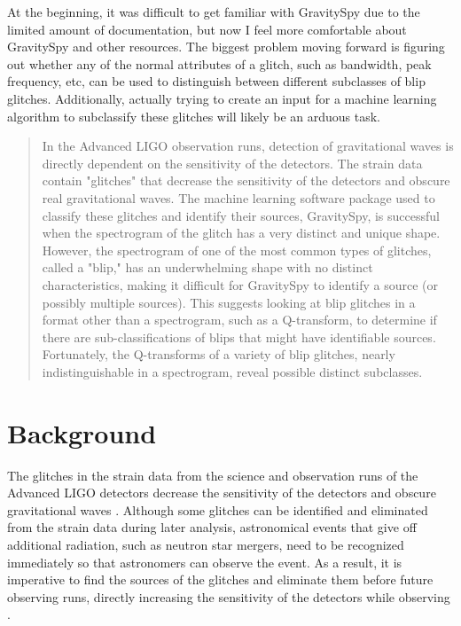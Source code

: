 \documentclass[a4paper]{article}
\begin{document}
At the beginning, it was difficult to get familiar with GravitySpy due to the limited amount of documentation, but now I feel more comfortable about GravitySpy and other resources. The biggest problem moving forward is figuring out whether any of the normal attributes of a glitch, such as bandwidth, peak frequency, etc, can be used to distinguish between different subclasses of blip glitches. Additionally, actually trying to create an input for a machine learning algorithm to subclassify these glitches will likely be an arduous task.

\pagebreak


\begin{abstract}

In the Advanced LIGO observation runs, detection of gravitational waves is directly dependent on the sensitivity of the detectors. The strain data contain "glitches" that decrease the sensitivity of the detectors and obscure real gravitational waves. The machine learning software package used to classify these glitches and identify their sources, GravitySpy, is successful when the spectrogram of the glitch has a very distinct and unique shape. However, the spectrogram of one of the most common types of glitches, called a "blip," has an underwhelming shape with no distinct characteristics, making it difficult for GravitySpy to identify a source (or possibly multiple sources). This suggests looking at blip glitches in a format other than a spectrogram, such as a Q-transform, to determine if there are sub-classifications of blips that might have identifiable sources. Fortunately, the Q-transforms of a variety of blip glitches, nearly indistinguishable in a spectrogram, reveal possible distinct subclasses.

\end{abstract}

\section{Background}

The glitches in the strain data from the science and observation runs of the Advanced LIGO detectors decrease the sensitivity of the detectors and obscure gravitational waves \cite{Zevin:2016}. Although some glitches can be identified and eliminated from the strain data during later analysis, astronomical events that give off additional radiation, such as neutron star mergers, need to be recognized immediately so that astronomers can observe the event. As a result, it is imperative to find the sources of the glitches and eliminate them before future observing runs, directly increasing the sensitivity of the detectors while observing \cite{Mukherjee:2010}. 
\end{document}
